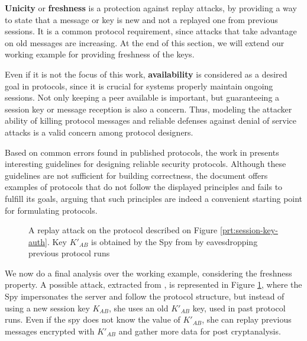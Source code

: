 \textbf{Unicity} or \textbf{freshness} is a protection against replay attacks, by providing a way to state that a message or key is new and not a replayed one from previous sessions. It is a common protocol requirement, since attacks that take advantage on old messages are increasing. At the end of this section, we will extend our working example for providing freshness of the keys.

Even if it is not the focus of this work, \textbf{availability} is considered as a desired goal in protocols, since it is crucial for systems properly maintain ongoing sessions. Not only keeping a peer available is important, but guaranteeing a session key or message reception is also a concern. Thus, modeling the attacker ability of killing protocol messages and reliable defenses against denial of service attacks is a valid concern among protocol designers.

Based on common errors found in published protocols, the work in \cite{abadi-needham-practices} presents interesting guidelines for designing reliable security protocols. Although these guidelines are not sufficient for building correctness, the document offers examples of protocols that do not follow the displayed principles and fails to fulfill its goals, arguing that such principles are indeed a convenient starting point for formulating protocols.

\begin{figure}[!ht]
  \centering

  \caption{A replay attack on the protocol described on Figure \ref{prt:session-key-auth}. Key $K'_{AB}$ is obtained by the Spy from by eavesdropping previous protocol runs}
  \label{fig:attack-ex-replay}
\end{figure}

We now do a final analysis over the working example, considering the freshness property. A possible attack, extracted from \cite{boyd-mathuria}, is represented in Figure \ref{fig:attack-ex-replay}, where the Spy impersonates the server and follow the protocol structure, but instead of using a new session key $K_{AB}$, she uses an old $K'_{AB}$ key, used in past protocol runs. Even if the spy does not know the value of $K'_{AB}$, she can replay previous messages encrypted with $K'_{AB}$ and gather more data for post cryptanalysis.

